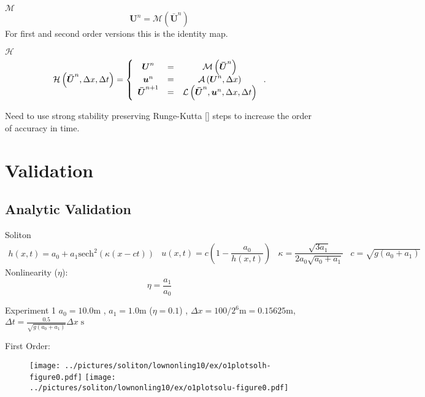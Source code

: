 \documentclass[pdf]{beamer}
\begin{document}
\begin{frame}{$\mathcal{M}$}
\[
	\boldsymbol{U}^n = \mathcal{M}\left(\boldsymbol{\bar{U}}^n\right) \]
For first and second order versions this is the identity map.
\end{frame}


\begin{frame}{$\mathcal{H}$}
\[\mathcal{H}\left(\boldsymbol{\bar{U}}^n,\Delta x ,\Delta t \right) = \left\lbrace 
\begin{array}{c c c} 
	\boldsymbol{U}^n &=& \mathcal{M}\left(\boldsymbol{\bar{U}}^n\right) \\
	\boldsymbol{u}^n &=& \mathcal{A}\left(\boldsymbol{U}^n, \Delta x\right) \\
	\boldsymbol{\bar{U}}^{n+1} &=& \mathcal{L}\left(\boldsymbol{\bar{U}}^{n},\boldsymbol{u}^n, \Delta x ,\Delta t\right)							
\end{array} \right. .\]

Need to use strong stability preserving Runge-Kutta [] steps to increase the order of accuracy in time.
\end{frame}

\section{Validation}
\subsection{Analytic Validation}

\begin{frame}{Soliton}
\begin{subequations}
\begin{gather}
h\left(x,t\right) = a_0 + a_1\text{sech}^2\left( \kappa\left(x - ct\right)\right)
\end{gather}
\begin{gather}
u\left(x,t\right) = c\left(1 - \dfrac{a_0}{h(x,t)} \right)
\end{gather}
\begin{gather}
\kappa = \dfrac{\sqrt{3a_1}}{2a_0 \sqrt{ a_0 + a_1}}
\end{gather}
\begin{gather}
c = \sqrt{g \left(a_0 + a_1\right)}
\end{gather}
\label{eq:sol}
\end{subequations}
Nonlinearity ($\eta$):
\[\eta = \frac{a_1}{a_0}\]
\end{frame}

\begin{frame}{Experiment 1}
$a_0 = 10.0\text{m}$ , $a_1 = 1.0\text{m}$ ($\eta = 0.1$) , $\Delta x = 100 /2^{6}\text{m} = 0.15625 \text{m}$, $\Delta t = \frac{0.5}{\sqrt{g (a_0 + a_1)}} \Delta x \; \text{s}$

First Order:

\begin{figure}
\texttt{[image: ../pictures/soliton/lownonling10/ex/o1plotsolh-figure0.pdf]}
\texttt{[image: ../pictures/soliton/lownonling10/ex/o1plotsolu-figure0.pdf]}
\end{figure}
\end{frame}
\end{document}
